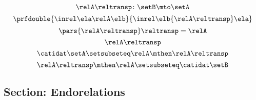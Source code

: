 {\begin{forslides}
        \begin{equation}
            \label{eq:slides_session2_rel_133}
            \relA\reltransp\colon \setB \mto \setA
        \end{equation}
        \begin{equation}
            \label{eq:slides_session2_rel_134}
            \prfdouble{
                \inrel \ela \relA \elb
            }{
                \inrel \elb {\relA\reltransp} \ela
            }
        \end{equation}
        \begin{equation}
            \label{eq:slides_session2_rel_135}
            \pars{\relA\reltransp}\reltransp = \relA
        \end{equation}
        \begin{equation}
            \label{eq:slides_session2_rel_136}
            \relA\reltransp
        \end{equation}
        \begin{equation}
            \label{eq:slides_session2_rel_137}
            \catidat\setA\setsubseteq \relA \mthen \relA\reltransp
        \end{equation}
        \begin{equation}
            \label{eq:slides_session2_rel_138}
            \relA\reltransp\mthen \relA\setsubseteq \catidat\setB
        \end{equation}

        \subsection{Section: Endorelations}


\end{forslides}}

